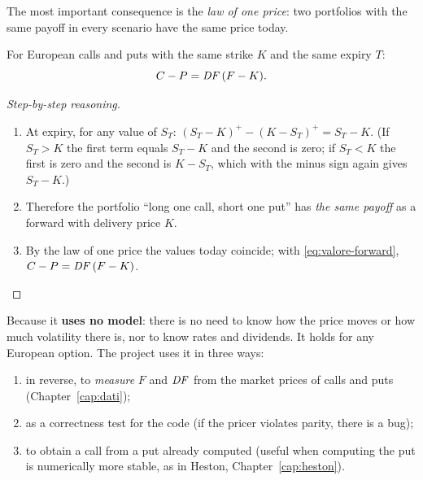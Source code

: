 The most important consequence is the \emph{law of one price}: two portfolios with the same payoff in every scenario
have the same price today.

\begin{proposizione}\label{prop:parita}
For European calls and puts with the same strike $K$ and the same expiry $T$:
\begin{equation}\label{eq:parita}
C-P=\mathit{DF}\,(F-K).
\end{equation}
\end{proposizione}

\begin{proof}[Step-by-step reasoning]\leavevmode
\begin{enumerate}
\item At expiry, for any value of $S_T$: $(S_T-K)^+-(K-S_T)^+=S_T-K$. (If $S_T>K$ the first term equals $S_T-K$ and
the second is zero; if $S_T<K$ the first is zero and the second is $K-S_T$, which with the minus sign again gives
$S_T-K$.)
\item Therefore the portfolio ``long one call, short one put'' has \emph{the same payoff} as a forward with delivery
price $K$.
\item By the law of one price the values today coincide; with \eqref{eq:valore-forward},
$C-P=\mathit{DF}\,(F-K)$.\qedhere
\end{enumerate}
\end{proof}

\begin{perche}[title={Why is it so important?}]
Because it \textbf{uses no model}: there is no need to know how the price moves or how much volatility there is, nor
to know rates and dividends. It holds for any European option. The project uses it in three ways:
\begin{enumerate}
\item in reverse, to \emph{measure} $F$ and $\mathit{DF}$ from the market prices of calls and puts
(Chapter~\ref{cap:dati});
\item as a correctness test for the code (if the pricer violates parity, there is a bug);
\item to obtain a call from a put already computed (useful when computing the put is numerically more stable, as in
Heston, Chapter~\ref{cap:heston}).
\end{enumerate}
\end{perche}

